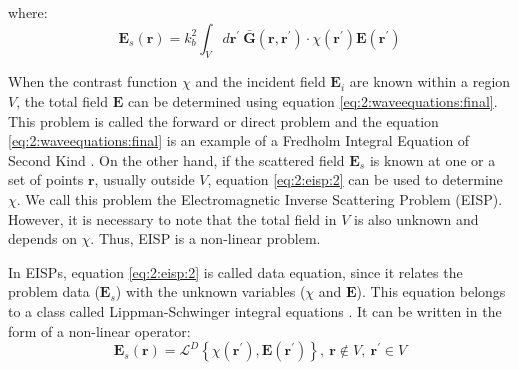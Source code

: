 			\noindent where:
			\begin{equation}
				\mathbf{E}_s(\mathbf{r}) = k_b^2\int_V d\mathbf{r^\prime}~\mathbf{\bar{G}}(\mathbf{r},\mathbf{r^\prime})\cdot\chi(\mathbf{r^\prime})\mathbf{E}(\mathbf{r^\prime}) \label{eq:2:eisp:2}
			\end{equation}
		
			When the contrast function $\chi$ and the incident field $\mathbf{E}_i$ are known within a region $V$, the total field $\mathbf{E}$ can be determined using equation \eqref{eq:2:waveequations:final}. This problem is called the forward or direct problem and the equation \eqref{eq:2:waveequations:final} is an example of a Fredholm Integral Equation of Second Kind \citep{polyanin2008handbook}. On the other hand, if the scattered field $\mathbf{E}_s$ is known at one or a set of points $\mathbf{r}$, usually outside $V$, equation \eqref{eq:2:eisp:2} can be used to determine $\chi$. We call this problem the Electromagnetic Inverse Scattering Problem (EISP). However, it is necessary to note that the total field in $V$ is also unknown and depends on $\chi$. Thus, EISP is a non-linear problem.
			
			In EISPs, equation \eqref{eq:2:eisp:2} is called data equation, since it relates the problem data ($\mathbf{E}_s$) with the unknown variables  ($\chi$ and $\mathbf{E}$). This equation belongs to a class called Lippman-Schwinger integral equations \citep{lippmann1950variational}. It can be written in the form of a non-linear operator:
			\begin{equation}
				\mathbf{E}_s(\mathbf{r}) = \mathcal{L}^D\left\{\chi(\mathbf{r^\prime}), \mathbf{E}(\mathbf{r^\prime})\right\},~\mathbf{r}\notin V,~ \mathbf{r^\prime}\in V \label{eq:2:eisp:3}
			\end{equation}
			
